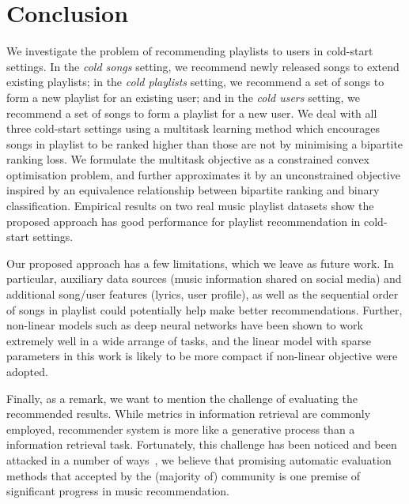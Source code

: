 \section{Conclusion}

We investigate the problem of recommending playlists to users in cold-start settings.
In the {\it cold songs} setting, we recommend newly released songs to extend existing playlists;
in the {\it cold playlists} setting, we recommend a set of songs to form a new playlist for an existing user;
and in the {\it cold users} setting, we recommend a set of songs to form a playlist for a new user.
We deal with all three cold-start settings using a multitask learning method which encourages songs in playlist 
to be ranked higher than those are not by minimising a bipartite ranking loss. 
We formulate the multitask objective as a constrained convex optimisation problem, and further approximates it 
by an unconstrained objective inspired by an equivalence relationship between bipartite ranking and binary classification. 
Empirical results on two real music playlist datasets show the proposed approach 
has good performance for playlist recommendation in cold-start settings.

Our proposed approach has a few limitations,
which we leave as future work.
In particular, auxiliary data sources (\eg music information shared on social media) and additional song/user 
features (\eg lyrics, user profile), as well as the sequential order of songs in playlist %
could potentially help make better recommendations.
Further, non-linear models such as deep neural networks have been shown to work extremely well in a wide arrange of tasks,
and the linear model with sparse parameters in this work is likely to be more compact if non-linear objective were adopted.

Finally, as a remark, we want to mention the challenge of evaluating the recommended results.
While metrics in information retrieval are commonly employed, recommender system is more like a generative process
than a information retrieval task. Fortunately, this challenge has been noticed and been attacked in a number of
ways~\cite{mcfee2011natural,mcfee2012hypergraph,schedl2017}, 
we believe that promising automatic evaluation methods that accepted by the (majority of) 
community is one premise of significant progress in music recommendation.
